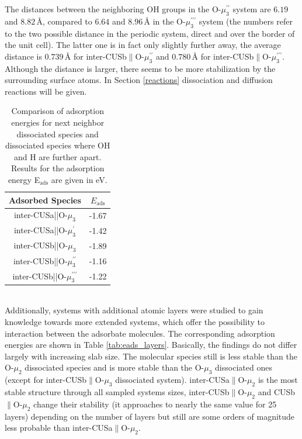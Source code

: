 \documentclass[11pt,DIV=13,BCOR=5mm,a4paper,headinclude]{scrbook}
\begin{document}
The distances between the neighboring OH groups in the O-$\mu_3^{\prime\prime}$ system are $6.19$ and $8.82\,$\AA{}, compared to $6.64$ and $8.96\,$\AA{} in the O-$\mu_3^{\prime\prime\prime}$ system (the numbers refer to the two possible distance in the periodic system, direct and over the border of the unit cell).
The latter one is in fact only slightly further away, the average distance is $0.739\,$\AA{} for inter-CUSb$\parallel$O-$\mu_3^{\prime\prime}$ and $0.780\,$\AA{} for inter-CUSb$\parallel$O-$\mu_3^{\prime\prime\prime}$.
Although the distance is larger, there seems to be more stabilization by the surrounding surface atoms.
In Section \ref{reactions} dissociation and diffusion reactions will be given.
\begin{table}[!ht]
  \centering
 \caption{Comparison of adsorption energies for next neighbor dissociated species and dissociated species where OH and H are further apart.
Results for the adsorption energy E$_\textrm{ads}$ are given in eV.
\vspace*{.2cm} 
  }
  \begin{tabular}{cc}
  \toprule
  Adsorbed Species  & $E_\text{ads}$  \\\midrule
   inter-CUSa||O-$\mu_3$ & -1.67 \\
   inter-CUSa||O-$\mu_3^\prime$ & -1.42 \\\hline
   inter-CUSb||O-$\mu_3$ & -1.89\\
   inter-CUSb||O-$\mu_3^{\prime\prime}$ & -1.16\\
   inter-CUSb||O-$\mu_3^{\prime\prime\prime}$ & -1.22\\\bottomrule
  \end{tabular}
  \label{tab:ads_1waterfurther}
\end{table}
\\
Additionally, systems with additional atomic layers were studied to gain knowledge towards more extended systems, which offer the possibility to interaction between the adsorbate molecules.
The corresponding adsorption energies are shown in Table \ref{tab:eads_layers}.
Basically, the findings do not differ largely with increasing slab size.
The molecular species still is less stable than the O-$\mu_2$ dissociated species and is more stable than the O-$\mu_3$ dissociated ones (except for inter-CUSb$\parallel$O-$\mu_3$ dissociated system).
inter-CUSa$\parallel$O-$\mu_2$ is the most stable structure through all sampled systems sizes, inter-CUSb$\parallel$O-$\mu_2$ and CUSb$\parallel$O-$\mu_2$ change their stability (it approaches to nearly the same value for 25 layers) depending on the number of layers but still are some orders of magnitude less probable than inter-CUSa$\parallel$O-$\mu_2$.
\end{document}
